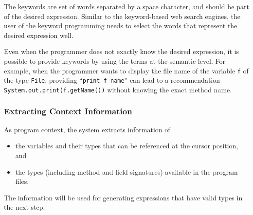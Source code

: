 \documentclass[PRO,english]{ipsj}
\begin{document}
The keywords are set of words separated by a space character, and should be part of the desired expression.  Similar to the keyword-based web search engines, the user of the keyword programming needs to select the words that represent the desired expression well.

Even when the programmer does not exactly know the desired expression, it is possible to provide keywords by using the terms at the semantic level.  For example, when the programmer wants to display the file name of the variable \texttt{f} of the type \texttt{File}, providing ``\texttt{print f name}'' can lead to a recommendation \texttt{System.out.print(f.getName())} without knowing the exact method name.


\subsubsection{Extracting Context Information}
As program context, the system extracts information of
\begin{itemize}
\item the variables and their types that can be referenced at the cursor position, and 
\item the types (including method and field signatures) available in the program files.
\end{itemize}
The information will be used for generating expressions that have valid types in the next step.


\end{document}
